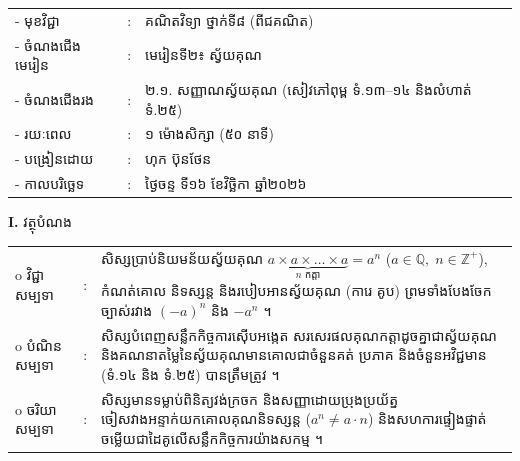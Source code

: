 \documentclass[a4paper,10pt]{article}
\newcommand{\wcirc}{{\CourierBullet\fontsize{9.5pt}{11pt}\selectfont o}}
\begin{document}
{\renewcommand{\arraystretch}{0.98}
\hspace*{3.1cm}%
\begin{tabular}{@{}l l L{11.0cm}@{}}
  - \hspace{0.35cm} មុខវិជ្ជា & : & គណិតវិទ្យា ថ្នាក់ទី៨ (ពីជគណិត) \\
  - \hspace{0.35cm} ចំណងជើងមេរៀន & : & មេរៀនទី២៖ ស្វ័យគុណ \\
  - \hspace{0.35cm} ចំណងជើងរង & : & ២.១. សញ្ញាណស្វ័យគុណ (សៀវភៅពុម្ព ទំ.១៣–១៤ និងលំហាត់ ទំ.២៥) \\
  - \hspace{0.35cm} រយៈពេល & : & ១ ម៉ោងសិក្សា (៥០ នាទី) \\
  - \hspace{0.35cm} បង្រៀនដោយ & : & ហុក ប៊ុនថែន \\
  - \hspace{0.35cm} កាលបរិច្ឆេទ & : & ថ្ងៃចន្ទ ទី១៦ ខែវិច្ឆិកា ឆ្នាំ២០២៦ \\
\end{tabular}

\vspace{2pt}

\textbf{I.} {\muol វត្ថុបំណង}\\[1pt]
\hspace*{0.55cm}%
\begin{tabular}{@{}l l L{14.2cm}@{}}
  \wcirc \hspace{0.25cm} វិជ្ជាសម្បទា & : & សិស្សប្រាប់និយមន័យស្វ័យគុណ $\underbrace{a\times a\times\dots\times a}_{n\text{ កត្តា}} = a^n$ ($a\in\mathbb{Q},\; n\in\mathbb{Z}^+$), កំណត់គោល និទស្សន្ត និងរបៀបអានស្វ័យគុណ (ការេ គូប) ព្រមទាំងបែងចែកច្បាស់រវាង $(-a)^n$ និង $-a^n$ ។ \\
  \wcirc \hspace{0.25cm} បំណិនសម្បទា & : & សិស្សបំពេញសន្លឹកកិច្ចការស៊ើបអង្កេត សរសេរផលគុណកត្តាដូចគ្នាជាស្វ័យគុណ និងគណនាតម្លៃនៃស្វ័យគុណមានគោលជាចំនួនគត់ ប្រភាគ និងចំនួនអវិជ្ជមាន (ទំ.១៤ និង ទំ.២៥) បានត្រឹមត្រូវ ។ \\
  \wcirc \hspace{0.25cm} ចរិយាសម្បទា & : & សិស្សមានទម្លាប់ពិនិត្យវង់ក្រចក និងសញ្ញាដោយប្រុងប្រយ័ត្ន ចៀសវាងអន្ទាក់យកគោលគុណនិទស្សន្ត ($a^n\neq a\cdot n$) និងសហការផ្ទៀងផ្ទាត់ចម្លើយជាដៃគូលើសន្លឹកកិច្ចការយ៉ាងសកម្ម ។ \\
\end{tabular}

}
\end{document}

